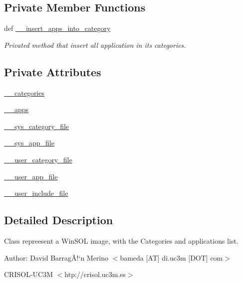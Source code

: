 \subsection*{Private Member Functions}
\begin{CompactItemize}
\item 
def \hyperlink{classwinsollib_1_1Image_4b7424fab5eef4b7b1ad815ad5b9c573}{\_\-\_\-insert\_\-apps\_\-into\_\-category}
\begin{CompactList}\small\item\em Privated method that insert all application in its categories. \item\end{CompactList}\end{CompactItemize}
\subsection*{Private Attributes}
\begin{CompactItemize}
\item 
\hyperlink{classwinsollib_1_1Image_c9cd5bdcffbf6898df5aa724da65e8d6}{\_\-\_\-categories}
\item 
\hyperlink{classwinsollib_1_1Image_bdf9339b698fcc8a571125ceac76f58d}{\_\-\_\-apps}
\item 
\hyperlink{classwinsollib_1_1Image_460f95c32ff9d5e4ec0eab437b2fafd3}{\_\-\_\-sys\_\-category\_\-file}
\item 
\hyperlink{classwinsollib_1_1Image_4fd20c6fef2a4868a20e50376bfbef9d}{\_\-\_\-sys\_\-app\_\-file}
\item 
\hyperlink{classwinsollib_1_1Image_e2ab3cab095938680977d2ff82665624}{\_\-\_\-user\_\-category\_\-file}
\item 
\hyperlink{classwinsollib_1_1Image_66d1f9e78b2602c1e43f8955333ddeca}{\_\-\_\-user\_\-app\_\-file}
\item 
\hyperlink{classwinsollib_1_1Image_c78c82718cbd8a1b0c562ed7d5825d7c}{\_\-\_\-user\_\-include\_\-file}
\end{CompactItemize}


\subsection{Detailed Description}
Class repreesent a Win\-SOL image, with the Categories and applications list. 

\begin{Desc}
\item[Author:]David Barrag\~{A}!`n Merino $<$bameda \mbox{[}AT\mbox{]} di.uc3m \mbox{[}DOT\mbox{]} com$>$ 

CRISOL-UC3M $<$htp://crisol.uc3m.es$>$ \end{Desc}




